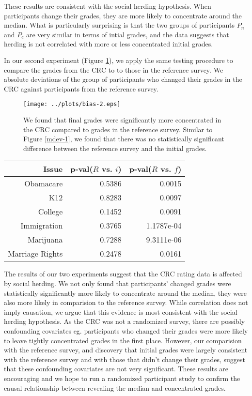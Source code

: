 These results are consistent with the social herding hypothesis.
When participants change their grades, they are more likely to concentrate around the median.
What is particularly surprising is that the two groups of participants $P_n$ and $P_c$ are very similar in terms of intial grades, and the data suggests that herding is not correlated with more or less concentrated initial grades.

In our second experiment (Figure \ref{mdev-2}), we apply the same testing procedure to compare the grades from the CRC to to those in the reference survey.
We absolute deviations of the group of participants who changed their grades in the CRC against participants from the reference survey.
\begin{figure}[h]
  \centering
    \texttt{[image: ../plots/bias-2.eps]}
      \caption{We found that final grades were significantly more concentrated in the CRC compared to grades in the reference survey. Similar to Figure \ref{mdev-1}, we found that there was no statistically significant difference between the reference survey and the initial grades.}
      \label{mdev-2}
\end{figure}

\begin{tabular}[!ht] { r | r | r }
\label{ref-1}
  Issue & p-val($R$ vs. $i$) & p-val($R$ vs. $f$) \\
  \hline
  \hline
  Obamacare &  0.5386 & 0.0015 \\
  \hline
  K12 & 0.8283 & 0.0097 \\
  \hline
  College & 0.1452 & 0.0091 \\
  \hline
  Immigration & 0.3765 & 1.1787e-04\\
  \hline
  Marijuana & 0.7288 & 9.3111e-06\\
  \hline
  Marriage Rights & 0.2478 & 0.0161 \\
\end{tabular}

The results of our two experiments suggest that the CRC rating data is affected by social herding.
We not only found that participants' changed grades were statistically significantly more likely to concentrate around the median, they were also more likely in comparision to the reference survey.
While correlation does not imply causation, we argue that this evidence is most consistent with the social herding hypothesis.
As the CRC was not a randomized survey, there are possibly confounding covariates eg. participants who changed their grades were more likely to leave tightly concentrated grades in the first place.
However, our comparision with the reference survey, and discovery that initial grades were largely consistent with the reference survey and with those that didn't change their grades, suggest that these confounding covariates are not very significant.
These results are encouraging and we hope to run a randomized participant study to confirm the causal relationship between revealing the median and concentrated grades.

